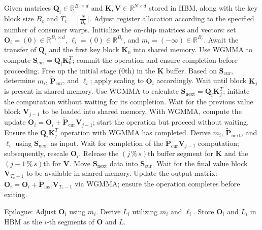 \begin{algorithm}[H]
    \caption{\small\label{alg:flash3_wgmma}\textsc{FlashAttention-3} consumer warpgroup forward pass}
    \begin{algorithmic}[1]
      \REQUIRE  Given matrices $\mathbf{Q}_i \in \mathbb{R}^{B_r \times d}$ and $\mathbf{K}, \mathbf{V} \in \mathbb{R}^{N \times d}$ stored in HBM, along with the key block size $B_c$ and $T_c = \lceil \frac{N}{B_c} \rceil$.
      \STATE Adjust register allocation according to the specified number of consumer warps.
      \STATE Initialize the on-chip matrices and vectors: set $\mathbf{O}_i = (0) \in \mathbb{R}^{B_r \times d}$, $\ell_i = (0) \in \mathbb{R}^{B_r}$, and $m_i = (-\infty) \in \mathbb{R}^{B_r}$.
      \STATE Await the transfer of $\mathbf{Q}_i$ and the first key block $\mathbf{K}_0$ into shared memory.
      \STATE Use WGMMA to compute $\mathbf{S}_{\mathrm{cur}} = \mathbf{Q}_i \mathbf{K}_0^T$; commit the operation and ensure completion before proceeding.
      \STATE Free up the initial stage ($0$th) in the $\mathbf{K}$ buffer.
      \STATE Based on $\mathbf{S}_{\mathrm{cur}}$, determine $m_{i}$, $\tilde{\mathbf{P}}_{\mathrm{cur}}$, and $\ell_{i}$; apply scaling to $\mathbf{O}_i$ accordingly.
        \STATE Wait until block $\mathbf{K}_j$ is present in shared memory.
        \label{code:mainloop_start}
        \STATE Use WGMMA to calculate $\mathbf{S}_{\mathrm{next}} = \mathbf{Q}_i \mathbf{K}_j^T$; initiate the computation without waiting for its completion. \label{code:first_wgmma}
        \STATE Wait for the previous value block $\mathbf{V}_{j-1}$ to be loaded into shared memory.
        \STATE With WGMMA, compute the update $\mathbf{O}_{i} = \mathbf{O}_{i} + \tilde{\mathbf{P}}_{\mathrm{cur}} \mathbf{V}_{j-1}$; start the operation but proceed without waiting. \label{code:second_wgmma}
        \STATE Ensure the $\mathbf{Q}_i \mathbf{K}_j^T$ operation with WGMMA has completed.
        \STATE Derive $m_{i}$, $\tilde{\mathbf{P}}_{\mathrm{next}}$, and $\ell_{i}$ using $\mathbf{S}_{\mathrm{next}}$ as input. \label{code:softmax}
        \STATE Wait for completion of the $\tilde{\mathbf{P}}_{\mathrm{cur}} \mathbf{V}_{j-1}$ computation; subsequently, rescale $\mathbf{O}_i$.
        \STATE Release the $(j\,\%\,s)$th buffer segment for $\mathbf{K}$ and the $(j-1\,\%\,s)$th for $\mathbf{V}$.
        \STATE Move $\mathbf{S}_{\mathrm{next}}$ data into $\mathbf{S}_{\mathrm{cur}}$.
        \label{code:mainloop_end}
      \ENDFOR \STATE Wait for the final value block $\mathbf{V}_{T_c - 1}$ to be available in shared memory.
      \STATE Update the output matrix:
      $\mathbf{O}_{i} = \mathbf{O}_{i} + \tilde{\mathbf{P}}_{\mathrm{last}} \mathbf{V}_{T_c - 1}$ via WGMMA; ensure the operation completes before exiting.

\STATE Epilogue: Adjust $\mathbf{O}_{i}$ using $m_{i}$. Derive $L_{i}$ utilizing $m_{i}$ and $\ell_{i}$.
      Store $\mathbf{O}_{i}$ and $L_{i}$ in HBM as the $i$-th segments of $\mathbf{O}$ and $L$.
    \end{algorithmic}
  \end{algorithm}


